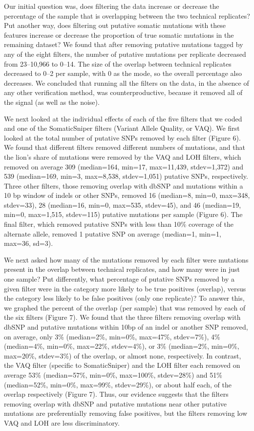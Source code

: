 \documentclass[11pt]{article} %
\begin{document}
Our initial question was, does filtering the data increase or decrease the percentage of the sample that is overlapping between the two technical replicates? Put another way, does filtering out putative somatic mutations with these features increase or decrease the proportion of true somatic mutations in the remaining dataset? We found that after removing putative mutations tagged by any of the eight filters, the number of putative mutations per replicate decreased from 23--10,966 to 0--14. The size of the overlap between technical replicates decreased to 0--2 per sample, with 0 as the mode, so the overall percentage also decreases. We concluded that running all the filters on the data, in the absence of any other verification method, was counterproductive, because it removed all of the signal (as well as the noise). 

We next looked at the individual effects of each of the five filters that we coded and one of the SomaticSniper filters (Variant Allele Quality, or VAQ). We first looked at the total number of putative SNPs removed by each filter (Figure 6). We found that different filters removed different numbers of mutations, and that the lion's share of mutations were removed by the VAQ and LOH filters, which removed on average 309 (median=164, min=17, max=11,439, stdev=1,372) and 539 (median=169, min=3, max=8,538, stdev=1,051) putative SNPs, respectively. Three other filters, those removing overlap with dbSNP and mutations within a 10 bp window of indels or other SNPs, removed 16 (median=8, min=0, max=348, stdev=33), 28 (median=16, min=0, max=535, stdev=45), and 46 (median=19, min=0, max=1,515, stdev=115) putative mutations per sample (Figure 6). The final filter, which removed putative SNPs with less than 10\% coverage of the alternate allele, removed 1 putative SNP on average (median=1, min=1, max=36, sd=3). 

We next asked how many of the mutations removed by each filter were mutations present in the overlap between technical replicates, and how many were in just one sample? Put differently, what percentage of putative SNPs removed by a given filter were in the category more likely to be true positives (overlap), versus the category less likely to be false positives (only one replicate)? To answer this, we graphed the percent of the overlap (per sample) that was removed by each of the six filters (Figure 7). We found that the three filters removing overlap with dbSNP and putative mutations within 10bp of an indel or another SNP removed, on average, only 3\% (median=2\%, min=0\%, max=47\%, stdev=7\%), 4\% (median=4\%, min=0\%, max=22\%, stdev=4\%), or 3\% (median=2\%, min=0\%, max=20\%, stdev=3\%) of the overlap, or almost none, respectively. In contrast, the VAQ filter (specific to SomaticSniper) and the LOH filter each removed on average 53\% (median=57\%, min=0\%, max=100\%, stdev=28\%) and 51\% (median=52\%, min=0\%, max=99\%, stdev=29\%), or about half each, of the overlap respectively (Figure 7). Thus, our evidence suggests that the filters removing overlap with dbSNP and putative mutations near other putative mutations are preferentially removing false positives, but the filters removing low VAQ and LOH are less discriminatory. 
\end{document}
